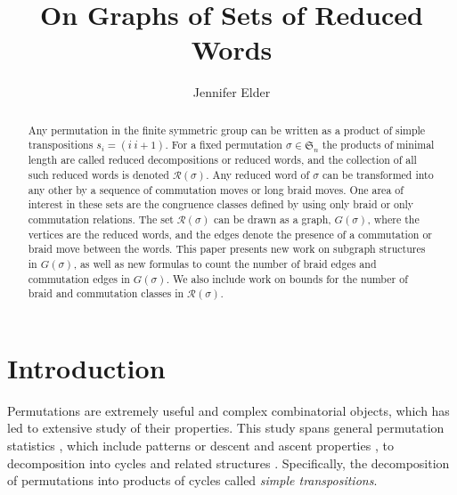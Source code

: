 \documentclass[11pt,reqno]{amsart}
\theoremstyle{definition}
\theoremstyle{notation}
\begin{document}
\title[On Graphs of Sets of Reduced Words]{On Graphs of Sets of Reduced Words}%
\author{Jennifer Elder} 
\address{Department of Computer Science, Math \& Physics. Missouri Western State University, 4525 Downs Drive, St. Joseph, MO 64507 }


\begin{abstract}
Any permutation in the finite symmetric group can be written as a product of simple transpositions $s_i = (i~i+1)$. For a fixed permutation $\sigma \in \mathfrak{S}_n$ the products of minimal length are called reduced decompositions or reduced words, and the collection of all such reduced words is denoted $\mathcal{R}(\sigma)$. Any reduced word of $\sigma$ can be transformed into any other by a sequence of commutation moves or long braid moves. One area of interest in these sets are the congruence classes defined by using only braid or only commutation relations. The set $\mathcal{R}(\sigma)$ can be drawn as a graph, $G(\sigma)$, where the vertices are the reduced words, and the edges denote the presence of a commutation or braid move between the words. This paper presents new work on subgraph structures in $G(\sigma)$, as well as new formulas to count the number of braid edges and commutation edges in $G(\sigma)$. We also include work on bounds for the number of braid and commutation classes in $\mathcal{R}(\sigma)$.
\end{abstract}

\maketitle


\section{Introduction}%

Permutations are extremely useful and complex combinatorial objects, which has led to extensive study of their properties. This study spans general permutation statistics \cite{elder2023homomesies, FindStat}, which include patterns \cite{TENNER2007888, T1} or descent and ascent properties \cite{Billey_Permu, DIAZLOPEZ2021112375}, to decomposition into cycles and related structures \cite{R, S1, T2}. Specifically, the decomposition of permutations into products of cycles called \emph{simple transpositions}. 
\end{document}
